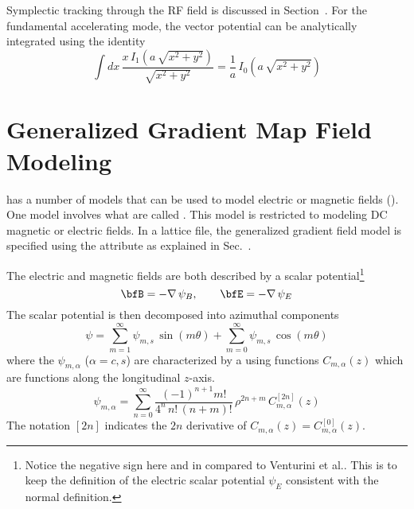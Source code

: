 Symplectic tracking through the RF field is discussed in Section~.  For the
fundamental accelerating mode, the vector potential can be analytically integrated using the
identity
\begin{equation}
  \int dx \,\frac{x \, I_1 (a \, \sqrt{x^2+y^2})}{\sqrt{x^2+y^2}}  = 
  \frac{1}{a} \, I_0 (a \, \sqrt{x^2+y^2})
\end{equation}

\section{Generalized Gradient Map Field Modeling}
\label{s:gen.grad.phys}

\bmad has a number of  models that can be used to model electric or magnetic fields
(). One model involves what are called \cite{b:gen.grad}.
This model is restricted to modeling DC magnetic or electric fields. In a lattice file, the
generalized gradient field model is specified using the  attribute as explained
in Sec.~.

The electric and magnetic fields are both described by a scalar potential\footnote
  {
Notice the negative sign here and in  compared to Venturini et al.\cite{b:gen.grad}. This
is to keep the definition of the electric scalar potential $\psi_E$ consistent with the normal
definition.
  }
\begin{equation}
  \bfB = -\nabla \, \psi_B, \qquad \bfE = -\nabla \, \psi_E
  \label{bpep2}
\end{equation}
The scalar potential is then decomposed into azimuthal components
\begin{equation}
  \psi = \sum_{m = 1}^\infty \psi_{m,s} \, \sin(m \theta) + \sum_{m = 0}^\infty \psi_{m,s} \, \cos(m \theta)
\end{equation}
where the $\psi_{m,\alpha}$ ($\alpha = c,s$) are characterized by a using functions
$C_{m,\alpha}(z)$ which are functions along the longitudinal $z$-axis.
\begin{equation}
  \psi_{m,\alpha} = \sum_{n = 0}^\infty \frac{(-1)^{n+1} m!}{4^n \, n! \, (n+m)!} 
  \, \rho^{2n+m} \, C_{m,\alpha}^{[2n]}(z) 
  \label{ppmpp}
\end{equation}
The notation $[2n]$ indicates the $2n$ derivative of $C_{m,\alpha}(z) = C_{m,\alpha}^{[0]}(z)$.

